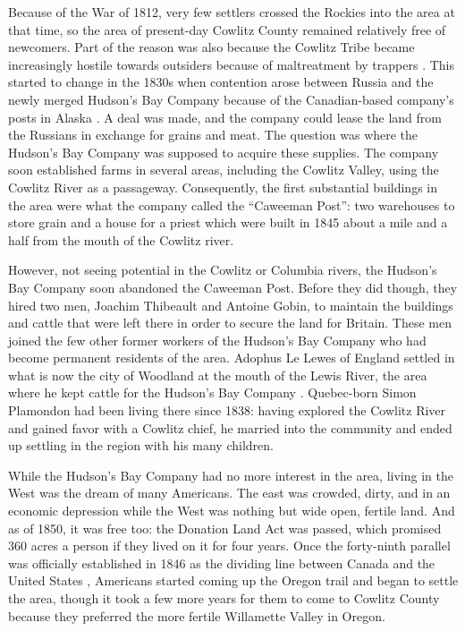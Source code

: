 Because of the War of 1812, very few settlers crossed the Rockies into the area at that time, so the area of present-day Cowlitz County remained relatively free of newcomers. Part of the reason was also because the Cowlitz Tribe became increasingly hostile towards outsiders because of maltreatment by trappers \citep[31]{urrutia_1998}. This started to change in the 1830s when contention arose between Russia and the newly merged Hudson's Bay Company because of the Canadian-based company's posts in Alaska \citep[27-29]{urrutia_1998}. A deal was made, and the company could lease the land from the Russians in exchange for grains and meat. The question was where the Hudson's Bay Company was supposed to acquire these supplies. The company soon established farms in several areas, including the Cowlitz Valley, using the Cowlitz River as a passageway. Consequently, the first substantial buildings in the area were what the company called the ``Caweeman Post'': two warehouses to store grain and a house for a priest which were built in 1845 about a mile and a half from the mouth of the Cowlitz river.

However, not seeing potential in the Cowlitz or Columbia rivers, the Hudson's Bay Company soon abandoned the Caweeman Post. Before they did though, they hired two men, Joachim Thibeault and Antoine Gobin, to maintain the buildings and cattle that were left there in order to secure the land for Britain. These men joined the few other former workers of the Hudson's Bay Company who had become permanent residents of the area. Adophus Le Lewes of England settled in what is now the city of Woodland at the mouth of the Lewis River, the area where he kept cattle for the Hudson's Bay Company \citep[37]{urrutia_1998}. Quebec-born Simon Plamondon had been living there since 1838: having explored the Cowlitz River and gained favor with a Cowlitz chief, he married into the community and ended up settling in the region with his many children.

While the Hudson's Bay Company had no more interest in the area, living in the West was the dream of many Americans. The east was crowded, dirty, and in an economic depression while the West was nothing but wide open, fertile land. And as of 1850, it was free too: the Donation Land Act was passed, which promised 360 acres a person if they lived on it for four years. Once the forty-ninth parallel was officially established in 1846 as the dividing line between Canada and the United States \citep[9]{olson_1948}, Americans started coming up the Oregon trail and began to settle the area, though it took a few more years for them to come to Cowlitz County because they preferred the more fertile Willamette Valley in Oregon.

